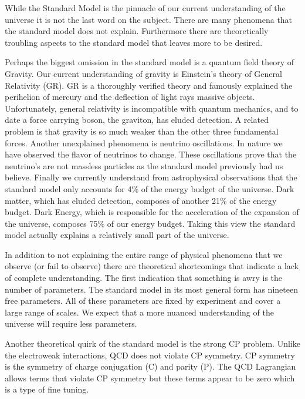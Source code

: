 
While the Standard Model is the pinnacle of our current understanding of the universe it is not the last word on the subject.
There are many phenomena that the standard model does not explain.
Furthermore there are theoretically troubling aspects to the standard model that leaves more to be desired.

Perhaps the biggest omission in the standard model is a quantum field theory of Gravity.
Our current understanding of gravity is Einstein's theory of General Relativity (GR).
GR is a thoroughly verified theory and famously explained the perihelion of mercury and the deflection of light rays massive objects.
Unfortunately, general relativity is incompatible with quantum mechanics, and to date a force carrying boson, the graviton, has eluded detection.
A related problem is that gravity is so much weaker than the other three fundamental forces.
Another unexplained phenomena is neutrino oscillations.
In nature we have observed the flavor of neutrinos to change.
These oscillations prove that the neutrino's are not massless particles as the standard model previously had us believe.
Finally we currently understand from astrophysical observations that the standard model only accounts for 4\% of the energy budget of the universe.
Dark matter, which has eluded detection, composes of another 21\% of the energy budget.
Dark Energy, which is responsible for the acceleration of the expansion of the universe, composes 75\% of our energy budget.
Taking this view the standard model actually explains a relatively small part of the universe.

In addition to not explaining the entire range of physical phenomena that we observe (or fail to observe) there are theoretical shortcomings that indicate a lack of complete understanding.
The first indication that something is awry is the number of parameters.
The standard model in its most general form has nineteen free parameters.
All of these parameters are fixed by experiment and cover a large range of scales.
We expect that a more nuanced understanding of the universe will require less parameters.

Another theoretical quirk of the standard model is the strong CP problem.
Unlike the electroweak interactions, QCD does not violate CP symmetry.
CP symmetry is the symmetry of charge conjugation (C) and parity (P).
The QCD Lagrangian allows terms that violate CP symmetry but these terms appear to be zero which is a type of fine tuning.


